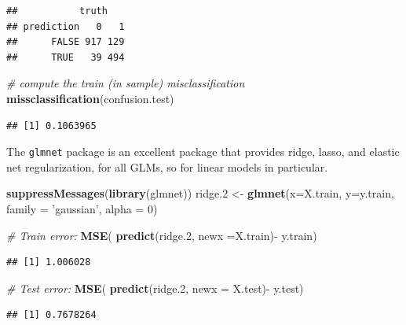 \documentclass[]{book}
\newenvironment{Shaded}{\begin{snugshade}}{\end{snugshade}}
\newcommand{\KeywordTok}[1]{\textcolor[rgb]{0.13,0.29,0.53}{\textbf{{#1}}}}
\newcommand{\DataTypeTok}[1]{\textcolor[rgb]{0.13,0.29,0.53}{{#1}}}
\newcommand{\DecValTok}[1]{\textcolor[rgb]{0.00,0.00,0.81}{{#1}}}
\newcommand{\FloatTok}[1]{\textcolor[rgb]{0.00,0.00,0.81}{{#1}}}
\newcommand{\StringTok}[1]{\textcolor[rgb]{0.31,0.60,0.02}{{#1}}}
\newcommand{\CommentTok}[1]{\textcolor[rgb]{0.56,0.35,0.01}{\textit{{#1}}}}
\newcommand{\NormalTok}[1]{{#1}}
\theoremstyle{definition}
\theoremstyle{definition}
\theoremstyle{remark}
\begin{document}
\begin{verbatim}
##           truth
## prediction   0   1
##      FALSE 917 129
##      TRUE   39 494
\end{verbatim}

\begin{Shaded}
\begin{Highlighting}[]
\CommentTok{# compute the train (in sample) misclassification}
\KeywordTok{missclassification}\NormalTok{(confusion.test)}
\end{Highlighting}
\end{Shaded}

\begin{verbatim}
## [1] 0.1063965
\end{verbatim}

The \texttt{glmnet} package is an excellent package that provides ridge,
lasso, and elastic net regularization, for all GLMs, so for linear
models in particular.

\begin{Shaded}
\begin{Highlighting}[]
\KeywordTok{suppressMessages}\NormalTok{(}\KeywordTok{library}\NormalTok{(glmnet))}
\NormalTok{ridge}\FloatTok{.2} \NormalTok{<-}\StringTok{ }\KeywordTok{glmnet}\NormalTok{(}\DataTypeTok{x=}\NormalTok{X.train, }\DataTypeTok{y=}\NormalTok{y.train, }\DataTypeTok{family =} \StringTok{'gaussian'}\NormalTok{, }\DataTypeTok{alpha =} \DecValTok{0}\NormalTok{)}

\CommentTok{# Train error:}
\KeywordTok{MSE}\NormalTok{( }\KeywordTok{predict}\NormalTok{(ridge}\FloatTok{.2}\NormalTok{, }\DataTypeTok{newx =}\NormalTok{X.train)-}\StringTok{ }\NormalTok{y.train)}
\end{Highlighting}
\end{Shaded}

\begin{verbatim}
## [1] 1.006028
\end{verbatim}

\begin{Shaded}
\begin{Highlighting}[]
\CommentTok{# Test error:}
\KeywordTok{MSE}\NormalTok{( }\KeywordTok{predict}\NormalTok{(ridge}\FloatTok{.2}\NormalTok{, }\DataTypeTok{newx =} \NormalTok{X.test)-}\StringTok{ }\NormalTok{y.test)}
\end{Highlighting}
\end{Shaded}

\begin{verbatim}
## [1] 0.7678264
\end{verbatim}
\end{document}
